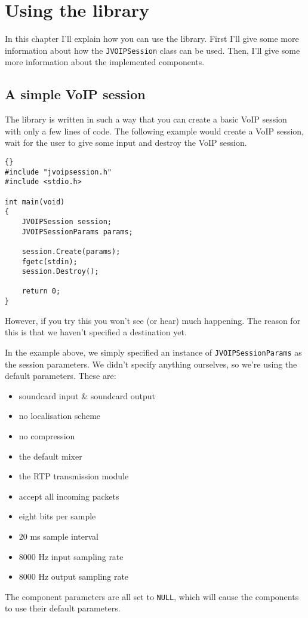 \chapter{Using the library}
In this chapter I'll explain how you can use the library. First I'll
give some more information about how the {\tt JVOIPSession} class can
be used. Then, I'll give some more information about the implemented
components.

	\section{A simple VoIP session}
	
	The library is written in such a way that you can create a basic
	VoIP session with only a few lines of code. The following example
	would create a VoIP session, wait for the user to give some input
	and destroy the VoIP session.
	\begin{lstlisting}[frame=tb]{}
#include "jvoipsession.h"
#include <stdio.h>

int main(void)
{
	JVOIPSession session;
	JVOIPSessionParams params;

	session.Create(params);
	fgetc(stdin);
	session.Destroy();

	return 0;
}
	\end{lstlisting}
	
	However, if you try this you won't see (or hear) much happening. The
	reason for this is that we haven't specified a destination yet.
	
	In the example above, we simply specified an instance of {\tt JVOIP\-Session\-Params}
	as the session parameters. We didn't specify anything ourselves, so
	we're using the default parameters. These are:
	\begin{itemize}
		\item soundcard input \& soundcard output
		\item no localisation scheme
		\item no compression
		\item the default mixer
		\item the RTP transmission module
		\item accept all incoming packets
		\item eight bits per sample
		\item 20 ms sample interval
		\item 8000 Hz input sampling rate
		\item 8000 Hz output sampling rate
	\end{itemize}
	The component parameters are all set to {\tt NULL}, which will cause the
	components to use their default parameters.
	
